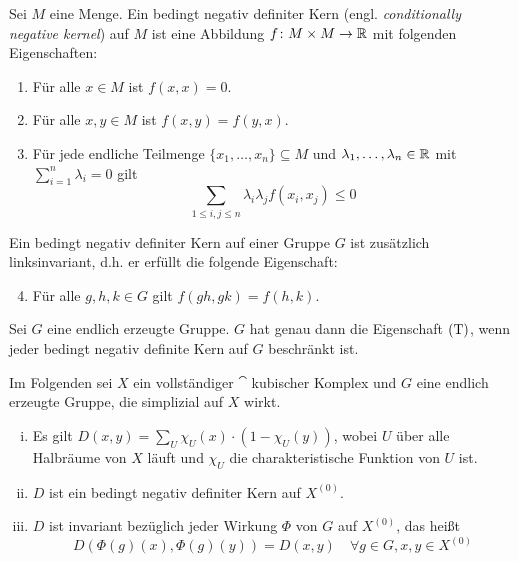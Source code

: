 \begin{defn}
\label{def_cnk}
	Sei $M$ eine Menge. Ein bedingt negativ definiter Kern (engl. \textit{conditionally negative kernel}) auf $M$ ist eine Abbildung $f \colon M \times M \rightarrow \mathbb{R}$ mit folgenden Eigenschaften:
	\begin{enumerate}[(1)]
		\item Für alle $x \in M$ ist $f(x,x) = 0$.
		\item Für alle $x,y \in M$ ist $f(x,y) = f(y,x)$.
		\item Für jede endliche Teilmenge $\{x_1,\dots,x_n\} \subseteq M$ und $\lambda_1, \dots, \lambda_n \in \mathbb{R}$ mit $\sum_{i=1}^{n} \lambda_i = 0$ gilt
		\[ \sum_{1 \leq i,j \leq n} \lambda_i \lambda_j f(x_i,x_j) \leq 0\]
	\end{enumerate}
	Ein bedingt negativ definiter Kern auf einer Gruppe $G$ ist zusätzlich linksinvariant, d.h. er erfüllt die folgende Eigenschaft:
	\begin{enumerate}[(1)] \setcounter{enumi}{3}
		\item Für alle $g,h,k \in G$ gilt $f(gh,gk) = f(h,k)$.
	\end{enumerate}
\end{defn}

\begin{satz}
\label{kazhdan_T}
	Sei $G$ eine endlich erzeugte Gruppe. $G$ hat genau dann die Eigenschaft $\operatorname{(T)}$, wenn jeder bedingt negativ definite Kern auf $G$ beschränkt ist.
\end{satz}

Im Folgenden sei $X$ ein vollständiger $\cat$ kubischer Komplex und $G$ eine endlich erzeugte Gruppe, die simplizial auf $X$ wirkt.

\begin{lemma}
\label{lemma_simp_metr}
	\begin{enumerate}[(i)]
		\item Es gilt $D(x,y) = \sum\limits_{U} \chi_U(x) \cdot (1 - \chi_U(y))$, wobei $U$ über alle Halbräume von $X$ läuft und $\chi_U$ die charakteristische Funktion von $U$ ist.
		\item $D$ ist ein bedingt negativ definiter Kern auf $X^{(0)}$.
		\item $D$ ist invariant bezüglich jeder Wirkung $\Phi$ von $G$ auf $X^{(0)}$, das heißt
		\[D(\Phi(g)(x),\Phi(g)(y)) = D(x,y) \quad \forall g \in G, x,y \in X^{(0)} \]
	\end{enumerate}
\end{lemma}

